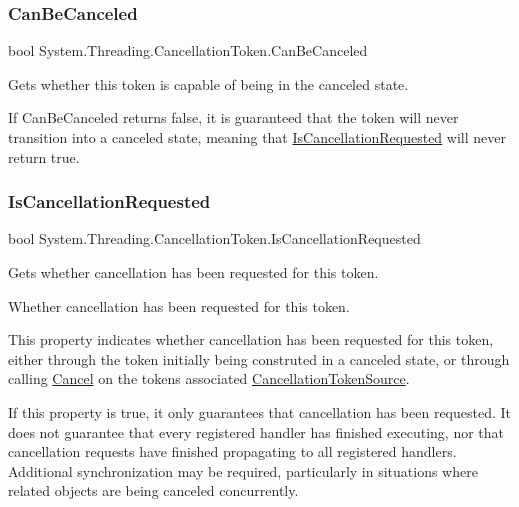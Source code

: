 \subsubsection{\texorpdfstring{Can\+Be\+Canceled}{CanBeCanceled}}
{\footnotesize\ttfamily bool System.\+Threading.\+Cancellation\+Token.\+Can\+Be\+Canceled\hspace{0.3cm}{\ttfamily [get]}}



Gets whether this token is capable of being in the canceled state. 

If Can\+Be\+Canceled returns false, it is guaranteed that the token will never transition into a canceled state, meaning that \hyperlink{struct_system_1_1_threading_1_1_cancellation_token_a1b0338d63f9b268339e7348629301748}{Is\+Cancellation\+Requested} will never return true. \mbox{\label{struct_system_1_1_threading_1_1_cancellation_token_a1b0338d63f9b268339e7348629301748}} 
\subsubsection{\texorpdfstring{Is\+Cancellation\+Requested}{IsCancellationRequested}}
{\footnotesize\ttfamily bool System.\+Threading.\+Cancellation\+Token.\+Is\+Cancellation\+Requested\hspace{0.3cm}{\ttfamily [get]}}



Gets whether cancellation has been requested for this token. 

Whether cancellation has been requested for this token.

This property indicates whether cancellation has been requested for this token, either through the token initially being construted in a canceled state, or through calling \hyperlink{class_system_1_1_threading_1_1_cancellation_token_source_a1c5aa6f903b7d50df87b7969f9ad10da}{Cancel} on the token\textquotesingle{}s associated \hyperlink{class_system_1_1_threading_1_1_cancellation_token_source}{Cancellation\+Token\+Source}. 

If this property is true, it only guarantees that cancellation has been requested. It does not guarantee that every registered handler has finished executing, nor that cancellation requests have finished propagating to all registered handlers. Additional synchronization may be required, particularly in situations where related objects are being canceled concurrently. \mbox{\label{struct_system_1_1_threading_1_1_cancellation_token_aa93a5902f076f45412f5e8fbfece237a}} 
